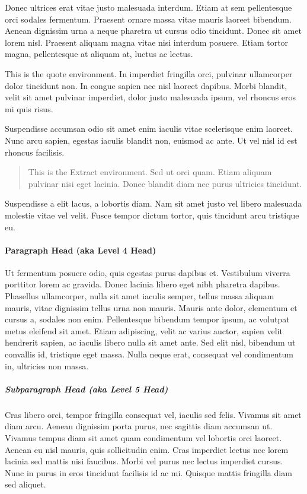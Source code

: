 Donec ultrices erat vitae justo malesuada interdum. Etiam at sem pellentesque orci sodales fermentum. Praesent ornare massa vitae mauris laoreet bibendum. Aenean dignissim urna a neque pharetra ut cursus odio tincidunt. Donec sit amet lorem nisl. Praesent aliquam magna vitae nisi interdum posuere. Etiam tortor magna, pellentesque at aliquam at, luctus ac lectus. 
\begin{italquote}This is the quote environment.  In imperdiet fringilla orci, pulvinar ullamcorper dolor tincidunt non. In congue sapien nec nisl laoreet dapibus. Morbi blandit, velit sit amet pulvinar imperdiet, dolor justo malesuada ipsum, vel rhoncus eros mi quis risus.\end{italquote}
 Suspendisse accumsan odio sit amet enim iaculis vitae scelerisque enim laoreet. Nunc arcu sapien, egestas iaculis blandit non, euismod ac ante. Ut vel nisl id est rhoncus facilisis. 
 \begin{quote} This is the Extract environment.  Sed ut orci quam. Etiam aliquam pulvinar nisi eget lacinia. Donec blandit diam nec purus ultricies tincidunt. 
 \end{quote}
 Suspendisse a elit lacus, a lobortis diam. Nam sit amet justo vel libero malesuada molestie vitae vel velit. Fusce tempor dictum tortor, quis tincidunt arcu tristique eu.

\paragraph{Paragraph Head (aka Level 4 Head)}
Ut fermentum posuere odio, quis egestas purus dapibus et. Vestibulum viverra porttitor lorem ac gravida. Donec lacinia libero eget nibh pharetra dapibus. Phasellus ullamcorper, nulla sit amet iaculis semper, tellus massa aliquam mauris, vitae dignissim tellus urna non mauris. Mauris ante dolor, elementum et cursus a, sodales non enim. Pellentesque bibendum tempor ipsum, ac volutpat metus eleifend sit amet. Etiam adipiscing, velit ac varius auctor, sapien velit hendrerit sapien, ac iaculis libero nulla sit amet ante. Sed elit nisl, bibendum ut convallis id, tristique eget massa. Nulla neque erat, consequat vel condimentum in, ultricies non massa. 

\subparagraph{Subparagraph Head (aka Level 5 Head)}
Cras libero orci, tempor fringilla consequat vel, iaculis sed felis. Vivamus sit amet diam arcu. Aenean dignissim porta purus, nec sagittis diam accumsan ut. Vivamus tempus diam sit amet quam condimentum vel lobortis orci laoreet. Aenean eu nisl mauris, quis sollicitudin enim. Cras imperdiet lectus nec lorem lacinia sed mattis nisi faucibus. Morbi vel purus nec lectus imperdiet cursus. Nunc in purus in eros tincidunt facilisis id ac mi. Quisque mattis fringilla diam sed aliquet. 


